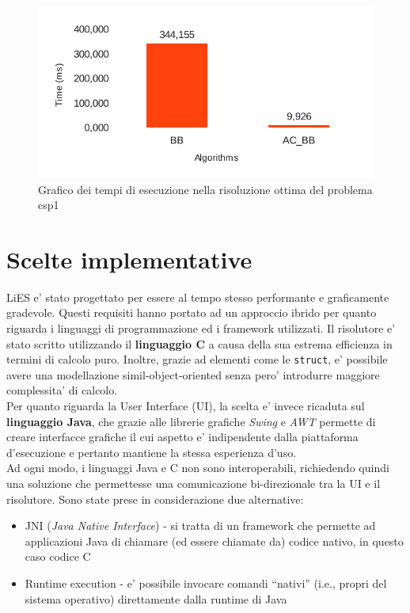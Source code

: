 \documentclass[10pt, a4paper]{article}
\begin{document}
\begin{figure}[!h]
\begin{center}
\includegraphics[scale=0.7]{./report-images/test3_time.pdf}
\caption{Grafico dei tempi di esecuzione nella risoluzione ottima del problema csp1}
\label{fig:test3_time}
\end{center}
\end{figure}

\section{Scelte implementative}
\label{sec:scelte_implementative}

LiES e' stato progettato per essere al tempo stesso performante e graficamente gradevole. Questi requisiti hanno portato ad un approccio ibrido per quanto riguarda i linguaggi di programmazione ed i framework utilizzati. Il risolutore e' stato scritto utilizzando il \textbf{linguaggio C} a causa della sua estrema efficienza in termini di calcolo puro. Inoltre, grazie ad elementi come le \verb+struct+, e' possibile avere una modellazione simil-object-oriented senza pero' introdurre maggiore complessita' di calcolo.\\

Per quanto riguarda la User Interface (UI), la scelta e' invece ricaduta sul \textbf{linguaggio Java}, che grazie alle librerie grafiche \textit{Swing} e \textit{AWT} permette di creare interfacce grafiche il cui aspetto e' indipendente dalla piattaforma d'esecuzione e pertanto mantiene la stessa esperienza d'uso.\\

Ad ogni modo, i linguaggi Java e C non sono interoperabili, richiedendo quindi una soluzione che permettesse una comunicazione bi-direzionale tra la UI e il risolutore. Sono state prese in considerazione due alternative:
\begin{itemize}
	\item JNI (\textit{Java Native Interface}) - si tratta di un framework che permette ad applicazioni Java di chiamare (ed essere chiamate da) codice nativo, in questo caso codice C
	\item Runtime execution - e' possibile invocare comandi ``nativi'' (i.e., propri del sistema operativo) direttamente dalla runtime di Java
\end{itemize}
\end{document}
